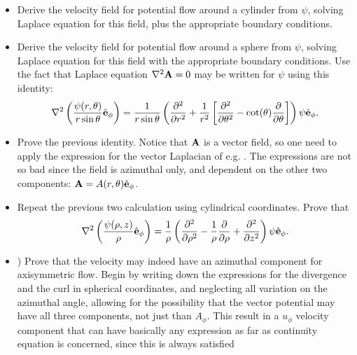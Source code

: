 \begin{itemize}
\item \label{ex:u_from_psi_cylinder} Derive the velocity field for
  potential flow around a cylinder from $\psi$, solving Laplace
  equation for this field, plus the appropriate boundary conditions.
  
\item \label{ex:u_from_psi_sphere} Derive the velocity field for
  potential flow around a sphere from $\psi$, solving Laplace equation
  for this field with the appropriate boundary conditions. Use the
  fact that Laplace equation $\nabla^2 \mathbf{A} = 0$ may be written for
  $\psi$ using this identity:
  \begin{equation}
    \label{eq:psi_eq_from_A}
    \nabla^2 \left(  \frac{\psi(r,\theta)}{r \sin\theta } \hat{\mathbf{e}}_\phi \right) =
    \frac{1}{r \sin\theta } 
    \left(
      \frac{\partial^2  }{\partial r^2} +
      \frac{1}{r^2} \left[
        \frac{\partial^2 }{\partial \theta^2} - 
        \cot(\theta) \frac{\partial }{\partial \theta}
      \right]
    \right) \psi \hat{\mathbf{e}}_\phi .
  \end{equation}

\item Prove the previous identity. Notice that $\mathbf{A}$ is a vector
  field, so one need to apply the expression for the vector Laplacian
  of e.g. \cite{wiki:del}. The expressions are not so bad since the
  field is azimuthal only, and dependent on the other two components:
  $ \mathbf{A} = A(r,\theta) \hat{\mathbf{e}}_\phi$.

\item Repeat the previous two calculation using cylindrical
  coordinates. Prove that
  \begin{equation}
    \label{eq:psi_eq_from_A_cyl}
    \nabla^2 \left(  \frac{\psi(\rho ,z) }{\rho} \hat{\mathbf{e}}_\phi \right) =
    \frac{1}{ \rho } 
    \left(
      \frac{\partial^2  }{\partial \rho^2} -
      \frac{1}{ \rho } 
      \frac{\partial  }{\partial \rho} +
      \frac{\partial^2  }{\partial z^2}
    \right) \psi \hat{\mathbf{e}}_\phi .
  \end{equation}
  

\item \label{ex:azimuthal_velocity}) Prove that the velocity may
  indeed have an azimuthal component for axisymmetric flow. Begin by
  writing down the expressions for the divergence and the curl in
  spherical coordinates, and neglecting all variation on the azimuthal
  angle, allowing for the possibility that the vector potential may
  have all three components, not just than $A_\phi$.  This result in a
  $u_\phi$ velocity component that can have basically any expression
  as far as continuity equation is concerned, since this is always
  satisfied




\end{itemize}



